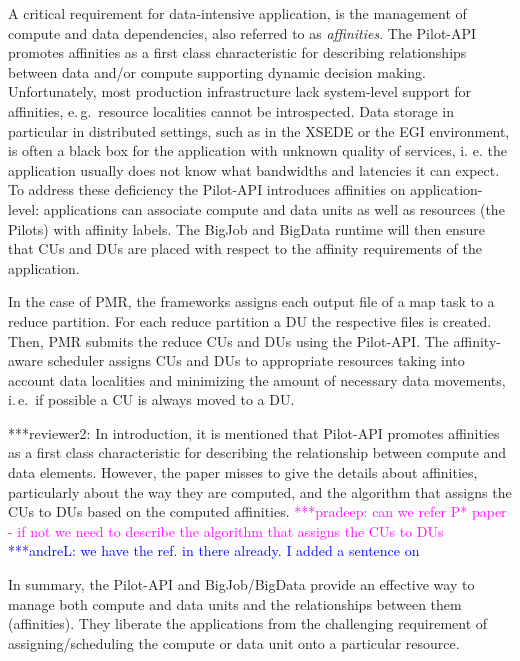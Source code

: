 \documentclass{acm_proc_article-sp}
\newcommand{\alnote}[1]{ {\textcolor{blue} { ***andreL: #1 }}}
\newcommand{\pnote}[1]{ {\textcolor{magenta} { ***pradeep: #1 }}}
\newcommand{\secrev}[1]{ {\textcolor{Bittersweet} { ***reviewer2: #1 }}}
\newcommand{\alnote}[1]{}
\newcommand{\pnote}[1]{}
\newcommand{\secrev}[1]{}
\newcommand{\pilots}{Pilots\xspace}
\begin{document}
A critical requirement for data-intensive application, is the management
of compute and data dependencies, also referred to as {\it affinities}. 
The Pilot-API promotes affinities as a first class
characteristic for describing relationships between data and/or
compute supporting dynamic decision making. Unfortunately, most
production infrastructure lack system-level support for affinities,
e.\,g.\ resource localities cannot be introspected. Data storage in
particular in distributed settings, such as in the XSEDE or the EGI
environment, is often a black box for the application with unknown
quality of services, i. e. the application usually does not know what
bandwidths and latencies it can expect. To address these deficiency
the Pilot-API introduces affinities on application-level: applications
can associate compute and data units as well as resources (the
\pilots) with affinity labels. The BigJob and BigData runtime will
then ensure that CUs and DUs are placed with respect to the affinity
requirements of the application. 

In the case of PMR, the frameworks assigns each output file of a map task to a
reduce partition. For each reduce partition a DU the respective files is
created. Then, PMR submits the reduce CUs and DUs using the Pilot-API. The
affinity-aware scheduler assigns CUs and DUs to appropriate resources taking
into account data localities and minimizing the amount of necessary data
movements, i.\,e.\ if possible a CU is always moved to a DU.

\secrev{ In introduction, it is mentioned that Pilot-API promotes affinities as
a first class characteristic for describing the relationship between compute and
data elements. However, the paper misses to give the details about affinities,
particularly about the way they are computed, and the algorithm that assigns the
CUs to DUs based on the computed affinities.} \pnote{can we refer P* paper - if
not we need to describe the algorithm that assigns the CUs to DUs} \alnote{we
have the ref. in there already. I added a sentence on }



In summary, the Pilot-API and BigJob/BigData provide an effective way to manage both
compute and data units and the relationships between them
(affinities). They liberate the applications from the challenging
requirement of assigning/scheduling the compute or data unit onto a
particular resource.
\end{document}
